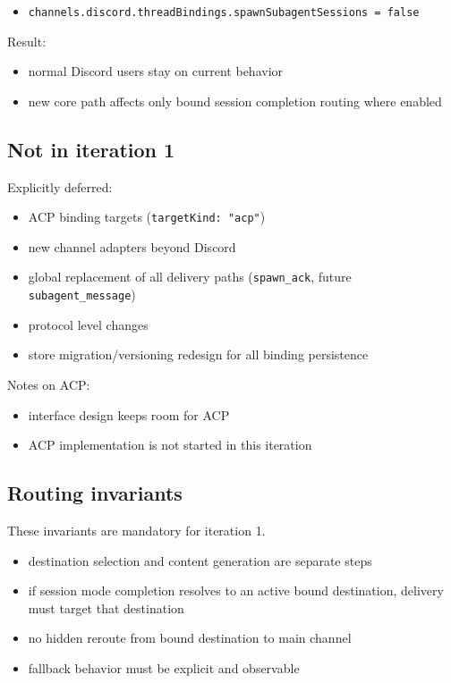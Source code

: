 \begin{itemize}
  \item \texttt{channels.discord.threadBindings.spawnSubagentSessions = false}
\end{itemize}


Result:

\begin{itemize}
  \item normal Discord users stay on current behavior
  \item new core path affects only bound session completion routing where enabled
\end{itemize}


\subsection{Not in iteration 1}


Explicitly deferred:

\begin{itemize}
  \item ACP binding targets (\texttt{targetKind: "acp"})
  \item new channel adapters beyond Discord
  \item global replacement of all delivery paths (\texttt{spawn\_ack}, future \texttt{subagent\_message})
  \item protocol level changes
  \item store migration/versioning redesign for all binding persistence
\end{itemize}


Notes on ACP:

\begin{itemize}
  \item interface design keeps room for ACP
  \item ACP implementation is not started in this iteration
\end{itemize}


\subsection{Routing invariants}


These invariants are mandatory for iteration 1.

\begin{itemize}
  \item destination selection and content generation are separate steps
  \item if session mode completion resolves to an active bound destination, delivery must target that destination
  \item no hidden reroute from bound destination to main channel
  \item fallback behavior must be explicit and observable
\end{itemize}


